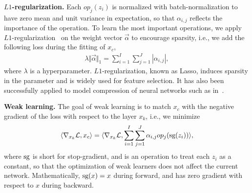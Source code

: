 \textbf{$L1$-regularization.} Each $op_j(z_i)$ is normalized with batch-normalization to have zero mean and unit variance in expectation, so that $\alpha_{i,j}$ reflects 
the importance of the operation.
To learn the most important operations, we apply $L1$-regularization~\citep{lasso} on the weight vector $\vec{\alpha}$ to encourage sparsity, i.e.,
we add the following loss during the fitting of $x_c$,  
\begin{align}
    \lambda \Vert \vec{\alpha} \Vert_1 = \sum_{i=1}^I \sum _{j=1}^J | \alpha _{i,j} |,
    \label{eq:x_c_select_loss}
\end{align} 
where $\lambda$ is a hyperparameter. $L1$-regularization, known as Lasso, induces sparsity in the parameter and is widely used for feature selection. It has also been successfully applied to model compression of neural networks such as in~\citep{huang2017condensenet}.


\textbf{Weak learning.} 
The goal of weak learning is to match $x_c$ with the negative gradient of the loss with respect to the layer $x_{k}$, i.e., 
we minimize 
\begin{align}
   \langle \nabla_{x_{k}} \mathcal{L}, x_c \rangle =  
   \langle \nabla_{x_{k}} \mathcal{L}, \sum _{i=1}^I \sum_{j=1}^J \alpha_{i,j} op_j( \textrm{sg}( z_i ) ) \rangle,
    \label{eq:x_c_linear_loss}
\end{align}
where $\textrm{sg}$ is short for stop-gradient, and is an operation to treat each $z_i$ as a constant, so that the optimization of weak learners does not 
affect the current network. Mathematically, $\textrm{sg}(x) = x$ during forward, and has zero gradient with respect to $x$ during backward.


